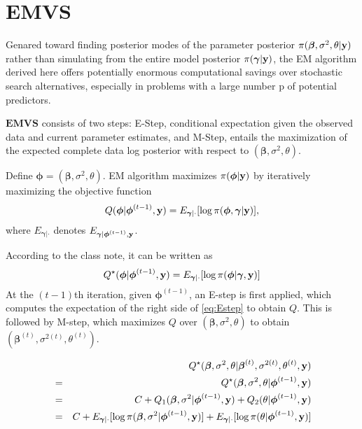 \documentclass[]{book}
\begin{document}
\hypertarget{emvs}{%
\section{EMVS}\label{emvs}}

Genared toward finding posterior modes of the parameter posterior \(\pi({\boldsymbol \beta},\sigma^2,\theta|{\bf y})\) rather than simulating from the entire model posterior \(\pi({\boldsymbol \gamma}|{\bf y})\), the EM algorithm derived here offers potentially enormous computational savings over stochastic search alternatives, especially in problems with a large number p of potential predictors.

\(\textbf{EMVS}\) consists of two steps: E-Step, conditional expectation given the observed data and current parameter estimates, and M-Step, entails the maximization of the expected complete data log posterior with respect to \(({\boldsymbol \beta},\sigma^2,\theta)\).

Define \({\boldsymbol \phi}= ({\boldsymbol \beta},\sigma^2,\theta)\). EM algorithm maximizes \(\pi({\boldsymbol \phi}|{\bf y})\) by iteratively maximizing the objective function
\begin{eqnarray*}
        Q({\boldsymbol \phi}|{\boldsymbol \phi}^{(t-1)},{\bf y}) = E_{{\boldsymbol \gamma}|\cdot}[\log \pi({\boldsymbol \phi},{\boldsymbol \gamma}|{\bf y})],
\end{eqnarray*}
where \(E_{{\boldsymbol \gamma}|\cdot}\) denotes \(E_{{\boldsymbol \gamma}|{\boldsymbol \phi}^{(t-1)},{\bf y}}\).

According to the class note, it can be written as
\begin{eqnarray}
    Q^{\star}({\boldsymbol \phi}|{\boldsymbol \phi}^{(t-1)},{\bf y}) = E_{{\boldsymbol \gamma}|\cdot}[\log \pi({\boldsymbol \phi}|{\boldsymbol \gamma},{\bf y})]
    \label{eq:Estep}
\end{eqnarray}
At the \((t-1)\)th iteration, given \({\boldsymbol \phi}^{(t-1)}\), an E-step is first applied, which computes the expectation of the right side of \eqref{eq:Estep} to obtain \(Q\). This is followed by M-step, which maximizes \(Q\) over \(({\boldsymbol \beta},\sigma^2,\theta)\) to obtain \(({\boldsymbol \beta}^{(t)},\sigma^{2{(t)}},\theta^{(t)})\).

\begin{eqnarray*}
        &&Q^{\star}({\boldsymbol \beta},\sigma^2,\theta|{\boldsymbol \beta}^{(t)},\sigma^{2{(t)}},\theta^{(t)},{\bf y}) \\
        &=& Q^{\star}({\boldsymbol \beta},\sigma^2,\theta|{\boldsymbol \phi}^{(t-1)},{\bf y}) \\
        &=& C + Q_1({\boldsymbol \beta},\sigma^2|{\boldsymbol \phi}^{(t-1)},{\bf y}) + Q_2(\theta|{\boldsymbol \phi}^{(t-1)},{\bf y})\\
        &=& C + E_{{\boldsymbol \gamma}|\cdot}[\log \pi({\boldsymbol \beta},\sigma^2|{\boldsymbol \phi}^{(t-1)},{\bf y})]+
        E_{{\boldsymbol \gamma}|\cdot}[\log \pi(\theta|{\boldsymbol \phi}^{(t-1)},{\bf y})]
\end{eqnarray*}
\end{document}

